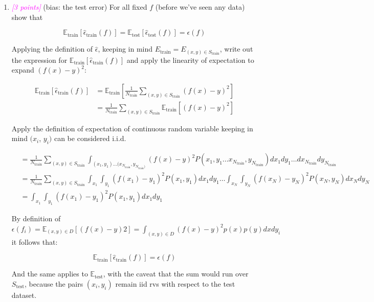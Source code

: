 \documentclass{article}
\newcommand{\1}{\mathbf{1}}
\newcommand{\E}{\mathbb{E}}
\newcommand{\points}[1]{\small\textcolor{magenta}{\emph{[#1 points]}} \normalsize}
\begin{document}
\begin{enumerate}
    \item \points{3} (bias: the test error) For all fixed $f$ (before we’ve seen any data) show that 
    
    $$\E_{\text{train}}[\widehat\epsilon_{\text{train}}(f)] = \E_\text{test}[\widehat\epsilon_\text{test}(f)]=\epsilon(f)$$
    
    Applying the definition of $\hat \epsilon $, keeping in mind $E_\text{train} = E_{(x,y)\in S_\text{train}}$, write out the expression for $\E_{\text{train}}[\widehat\epsilon_{\text{train}}(f)]$ and apply the linearity of expectation to expand $(f(x)-y)^2$:
    
    \begin{align*}
        \E_\text{train} [\widehat\epsilon_\text{train}(f)] &= \E_\text{train}\left[\frac{1}{N_\text{train}} \sum_{(x,y)\in S_\text{train}} (f(x)-y)^2 \right] \\
        &= \frac{1}{N_\text{train}} \sum_{(x,y)\in S_\text{train}} \E_\text{train}\left[ (f(x)-y)^2 \right] 
    \end{align*}{}
    
    Apply the definition of expectation of continuous random variable keeping in mind $(x_i$, $y_i)$ can be considered i.i.d. 
    
    \begin{align*}
     &= \frac{1}{N_\text{train}} \sum_{(x,y)\in S_\text{train}} \int_{(x_1,y_1)\hdots (x_{N_\text{train}},y_{N_\text{train})}} (f(x)-y)^2 P(x_1, y_1 \hdots x_{N_\text{train}},y_{N_\text{train}}) dx_1dy_1\hdots dx_{N_\text{train}} dy_{N_\text{train}} \\    
     &= \frac{1}{N_\text{train}} \sum_{(x,y)\in S_\text{train}} \int_{x_1}\int_{y_1} (f(x_1)-y_1)^2P(x_1,y_1) dx_1 dy_1 \hdots  \int_{x_N}\int_{y_N} (f(x_N) - y_N)^2P(x_N, y_N) dx_N dy_N \\    
     & = \int_{x_1}\int_{y_1} (f(x_1)-y_1)^2P(x_1,y_1) dx_1 dy_1
    \end{align*}{}
    
    By definition of $\epsilon(f_i) = \E_{(x,y)\in D}[(f(x)-y)2] = \int_{(x,y)\in D} (f(x)-y)^2p(x)p(y)dxdy_i$ it follows that:
    
    $$\E_\text{train} [\widehat\epsilon_\text{train}(f)] = \epsilon(f)$$
    
    And the same applies to $\E_\text{test}$, with the caveat that the sum would run over $S_\text{test}$, because the pairs $(x_i,y_i)$ remain iid rvs with respect to the test dataset. 


\end{enumerate}
\end{document}
